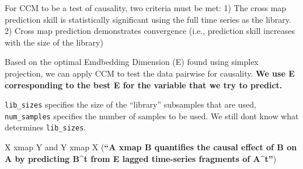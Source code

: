\documentclass[
]{article}
\begin{document}
For CCM to be a test of causality, two criteria must be met: 1) The
cross map prediction skill is statistically significant using the full
time series as the library. 2) Cross map prediction demonstrates
convergence (i.e., prediction skill increases with the size of the
library)

Based on the optimal Emdbedding Dimension (E) found using simplex
projection, we can apply CCM to test the data pairwise for causality.
\textbf{We use E corresponding to the best E for the variable that we
try to predict.}

\texttt{lib\_sizes} specifies the size of the ``library'' subsamples
that are used, \texttt{num\_samples} specifies the number of samples to
be used. We still dont know what determines \texttt{lib\_sizes}.

X xmap Y and Y xmap X (\textbf{``A xmap B quantifies the causal effect
of B on A by predicting B\^{}t from E lagged time-series fragments of
A\^{}t''})
\end{document}
